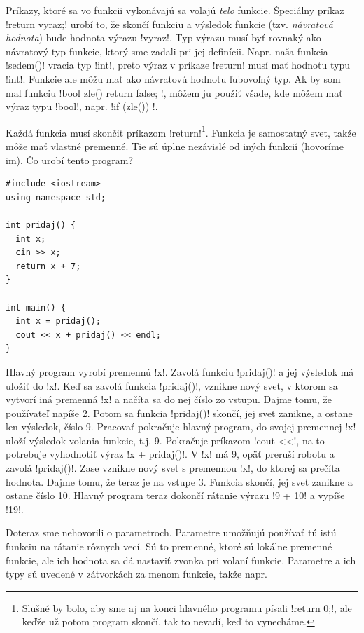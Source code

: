  Príkazy, ktoré sa vo funkcii vykonávajú sa volajú {\em telo} funkcie. Špeciálny 
príkaz \prg!return vyraz;! urobí to, že skončí funkciu a výsledok funkcie 
(tzv. {\em návratová hodnota}) bude hodnota výrazu \prg!vyraz!. Typ výrazu musí byť rovnaký
ako návratový typ funkcie, ktorý sme zadali pri jej definícii. Napr. naša funkcia
\prg!sedem()! vracia typ \prg!int!, preto výraz v príkaze \prg!return! musí mať hodnotu typu
\prg!int!. Funkcie ale môžu mať ako návratovú hodnotu ľubovoľný typ. Ak by som mal
funkciu \prg!bool zle() { return false; }!, môžem ju použiť všade, kde môžem mať výraz typu
\prg!bool!, napr. \prg!if (zle()) {}!.


Každá funkcia musí skončiť príkazom
\prg!return!\footnote{Slušné by bolo, aby sme aj na konci hlavného programu písali 
\prg!return 0;!, ale keďže už potom program skončí, tak to nevadí, keď to vynecháme.}.
Funkcia je samostatný svet, takže môže mať vlastné premenné. Tie sú úplne nezávislé
od iných funkcií (hovoríme im). Čo urobí tento program?

\begin{lstlisting}[] 
#include <iostream>
using namespace std;

int pridaj() {
  int x;
  cin >> x;
  return x + 7;
}

int main() {
  int x = pridaj();
  cout << x + pridaj() << endl;
}
\end{lstlisting}

Hlavný program vyrobí premennú \prg!x!. Zavolá funkciu \prg!pridaj()! a jej
výsledok má uložiť do \prg!x!. Keď sa zavolá funkcia \prg!pridaj()!, vznikne 
nový svet, v ktorom sa vytvorí iná premenná \prg!x! a načíta sa do nej číslo zo vstupu.
Dajme tomu, že používateľ napíše 2.
Potom sa funkcia \prg!pridaj()! skončí, jej svet zanikne, a ostane len výsledok, číslo 9. 
Pracovať pokračuje hlavný program, do svojej premennej \prg!x! 
uloží výsledok volania funkcie, t.j. 9. Pokračuje príkazom \prg!cout <<!, 
na to potrebuje vyhodnotiť
výraz \prg!x + pridaj()!. V \prg!x! má 9, opäť preruší robotu a zavolá \prg!pridaj()!.
Zase vznikne nový svet s premennou \prg!x!, do ktorej sa prečíta hodnota. 
Dajme tomu, že teraz
je na vstupe 3. Funkcia skončí, jej svet zanikne a ostane číslo 10. Hlavný program
teraz dokončí rátanie výrazu \prg!9 + 10! a vypíše \prg!19!.


Doteraz sme nehovorili o parametroch. Parametre umožňujú používať tú istú funkciu na
rátanie rôznych vecí. Sú to premenné, ktoré sú lokálne premenné funkcie, ale
ich hodnota sa dá nastaviť zvonka pri volaní funkcie. Parametre a ich typy
sú uvedené v zátvorkách za menom funkcie, takže napr.\\

